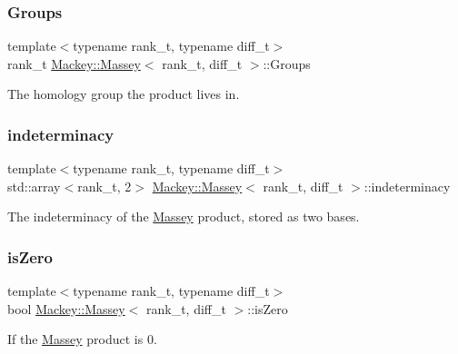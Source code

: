 \subsubsection{\texorpdfstring{Groups}{Groups}}
{\footnotesize\ttfamily template$<$typename rank\+\_\+t, typename diff\+\_\+t$>$ \\
rank\+\_\+t \hyperlink{classMackey_1_1Massey}{Mackey\+::\+Massey}$<$ rank\+\_\+t, diff\+\_\+t $>$\+::Groups}



The homology group the product lives in. 

\mbox{\label{classMackey_1_1Massey_a16f62ab5c5d3960702ae9804a3cbdb1f}} 
\subsubsection{\texorpdfstring{indeterminacy}{indeterminacy}}
{\footnotesize\ttfamily template$<$typename rank\+\_\+t, typename diff\+\_\+t$>$ \\
std\+::array$<$rank\+\_\+t, 2$>$ \hyperlink{classMackey_1_1Massey}{Mackey\+::\+Massey}$<$ rank\+\_\+t, diff\+\_\+t $>$\+::indeterminacy}



The indeterminacy of the \hyperlink{classMackey_1_1Massey}{Massey} product, stored as two bases. 

\mbox{\label{classMackey_1_1Massey_a8e1b4f51835a4de55c6d10e14a607189}} 
\subsubsection{\texorpdfstring{is\+Zero}{isZero}}
{\footnotesize\ttfamily template$<$typename rank\+\_\+t, typename diff\+\_\+t$>$ \\
bool \hyperlink{classMackey_1_1Massey}{Mackey\+::\+Massey}$<$ rank\+\_\+t, diff\+\_\+t $>$\+::is\+Zero}



If the \hyperlink{classMackey_1_1Massey}{Massey} product is 0. 

\mbox{\label{classMackey_1_1Massey_a4dbd74288447b094c8308f4d68bf8cff}} 
